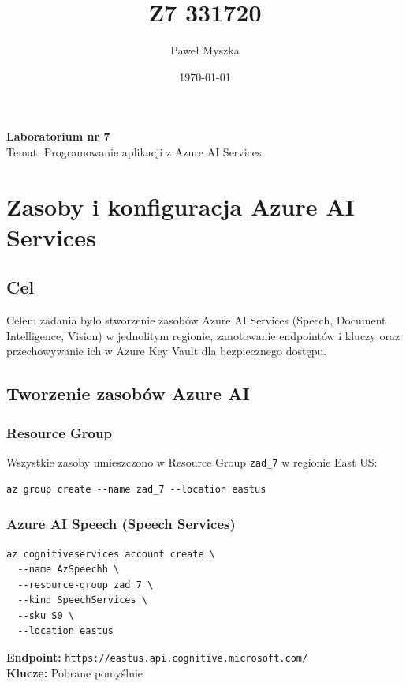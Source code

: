 \documentclass[twoside]{article}
\title{Z7 331720}
\author{Paweł Myszka}
\date{\today}
\begin{document}
	
	\pagestyle{fancy}
	\fancyhead{}
	\fancyhead[L]{\@title}
	\fancyhead[R]{\@author}
	\fancyhead[C]{\@date}
	
	\cfoot{\thepage\ / \pageref{LastPage}}
	
	\newpage
	\begin{center}
		{\Huge \textbf{Laboratorium nr 7}}\\[0.5cm]
		{\Large Temat: Programowanie aplikacji z Azure AI Services}
	\end{center}
	
	\newpage

\section{Zasoby i konfiguracja Azure AI Services}

\subsection{Cel}
Celem zadania było stworzenie zasobów Azure AI Services (Speech, Document Intelligence, Vision) w jednolitym regionie, zanotowanie endpointów i kluczy oraz przechowywanie ich w Azure Key Vault dla bezpiecznego dostępu.

\subsection{Tworzenie zasobów Azure AI}

\subsubsection{Resource Group}
Wszystkie zasoby umieszczono w Resource Group \texttt{zad\_7} w regionie East US:

\begin{verbatim}
az group create --name zad_7 --location eastus
\end{verbatim}

\subsubsection{Azure AI Speech (Speech Services)}
\begin{verbatim}
az cognitiveservices account create \
  --name AzSpeechh \
  --resource-group zad_7 \
  --kind SpeechServices \
  --sku S0 \
  --location eastus
\end{verbatim}

\textbf{Endpoint:} \texttt{https://eastus.api.cognitive.microsoft.com/} \\
\textbf{Klucze:} Pobrane pomyślnie
\end{document}
